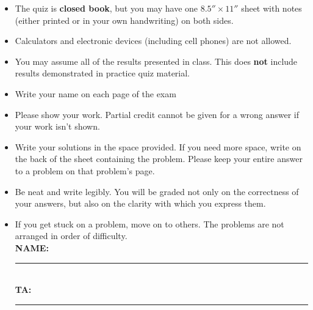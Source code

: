 \documentclass[12pt,twoside]{article}
\begin{document}
\begin{itemize}

\item  The quiz is \textbf{closed book}, but you may have one $8.5''  \times 11''$ sheet with notes (either printed or in your own handwriting) on both sides.

\item Calculators and electronic devices (including cell phones) are not allowed.

\item You may assume all of the results presented in class. This does \textbf{not} include results demonstrated in practice quiz material.

\item Write your name on each page of the exam

 \item Please show your work. Partial credit cannot be given for a wrong answer if your work isn't shown.

 \item Write your solutions in the space provided. If you need more space, write on the back of the sheet containing the problem. Please keep your entire answer to a problem on that problem's page.

 \item Be neat and write legibly. You will be graded not only on the correctness of your answers, but also on the clarity with which you express them.

 \item  If you get stuck on a problem, move on to others. The problems are not arranged in order of difficulty.\\


 \textbf{NAME:} \rule{5in}{0.5pt}\\
 
 \textbf{TA:} \rule{5.34in}{0.5pt}\\
 
\centering
{}
\end{itemize}
\end{document}
